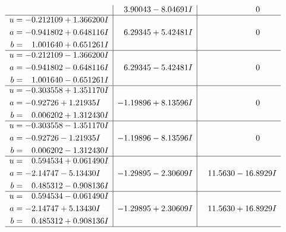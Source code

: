 \documentclass[1p]{elsarticle_modified}
\theoremstyle{definition}
\begin{document}
$$\begin{array}{c|c|c}
 & \phantom{-}3.90043 - 8.04691 I & \phantom{-0.000000 } 0 \\ \hline\begin{aligned}
u &= -0.212109 + 1.366200 I \\
a &= -0.941802 + 0.648116 I \\
b &= \phantom{-}1.001640 + 0.651261 I\end{aligned}
 & \phantom{-}6.29345 + 5.42481 I & \phantom{-0.000000 } 0 \\ \hline\begin{aligned}
u &= -0.212109 - 1.366200 I \\
a &= -0.941802 - 0.648116 I \\
b &= \phantom{-}1.001640 - 0.651261 I\end{aligned}
 & \phantom{-}6.29345 - 5.42481 I & \phantom{-0.000000 } 0 \\ \hline\begin{aligned}
u &= -0.303558 + 1.351170 I \\
a &= -0.92726 + 1.21935 I \\
b &= \phantom{-}0.006202 + 1.312430 I\end{aligned}
 & -1.19896 + 8.13596 I & \phantom{-0.000000 } 0 \\ \hline\begin{aligned}
u &= -0.303558 - 1.351170 I \\
a &= -0.92726 - 1.21935 I \\
b &= \phantom{-}0.006202 - 1.312430 I\end{aligned}
 & -1.19896 - 8.13596 I & \phantom{-0.000000 } 0 \\ \hline\begin{aligned}
u &= \phantom{-}0.594534 + 0.061490 I \\
a &= -2.14747 - 5.13430 I \\
b &= \phantom{-}0.485312 - 0.908136 I\end{aligned}
 & -1.29895 - 2.30609 I & \phantom{-}11.5630 - 16.8929 I \\ \hline\begin{aligned}
u &= \phantom{-}0.594534 - 0.061490 I \\
a &= -2.14747 + 5.13430 I \\
b &= \phantom{-}0.485312 + 0.908136 I\end{aligned}
 & -1.29895 + 2.30609 I & \phantom{-}11.5630 + 16.8929 I\\
 \hline 
 \end{array}$$\newpage$$\begin{array}{c|c|c}  

\end{array}$$
\end{document}
